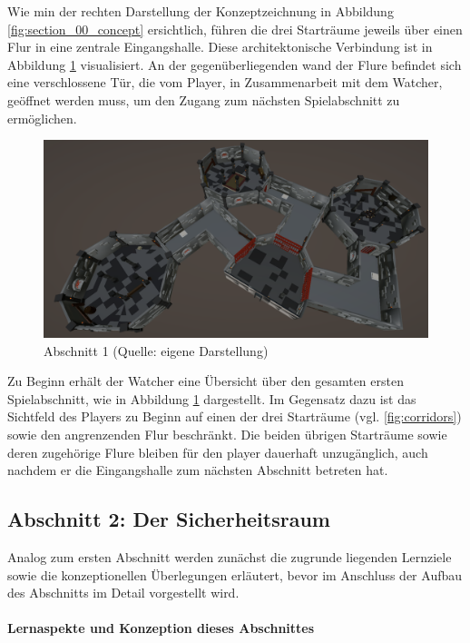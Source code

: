 Wie min der rechten Darstellung der Konzeptzeichnung in Abbildung \ref{fig:section_00_concept} ersichtlich, führen die drei Starträume jeweils über einen Flur in eine zentrale Eingangshalle. Diese architektonische Verbindung ist in Abbildung \ref{fig:section_00} visualisiert. An der gegenüberliegenden wand der Flure befindet sich eine verschlossene Tür, die vom Player, in Zusammenarbeit mit dem Watcher, geöffnet werden muss, um den Zugang zum nächsten Spielabschnitt zu ermöglichen.

\begin{figure}[ht]
\centering
\includegraphics[width=1\linewidth]{content/pictures/Abschnitt_00.PNG}
\caption{Abschnitt 1 (Quelle: eigene Darstellung)}
\label{fig:section_00}
\end{figure}

Zu Beginn erhält der Watcher eine Übersicht über den gesamten ersten Spielabschnitt, wie in Abbildung  \ref{fig:section_00} dargestellt. Im Gegensatz dazu ist das Sichtfeld des Players zu Beginn auf einen der drei Starträume (vgl. \ref{fig:corridors}) sowie den angrenzenden Flur beschränkt. Die beiden übrigen Starträume sowie deren zugehörige Flure bleiben für den player dauerhaft unzugänglich, auch nachdem er die Eingangshalle zum nächsten Abschnitt betreten hat.

\subsection{Abschnitt 2: Der Sicherheitsraum}

Analog zum ersten Abschnitt werden zunächst die zugrunde liegenden Lernziele sowie die konzeptionellen Überlegungen erläutert, bevor im Anschluss der Aufbau des Abschnitts im Detail vorgestellt wird.

\paragraph{Lernaspekte und Konzeption dieses Abschnittes}

